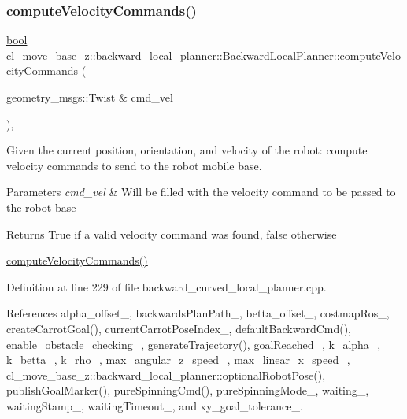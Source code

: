 \subsubsection{\texorpdfstring{compute\+Velocity\+Commands()}{computeVelocityCommands()}}
{\footnotesize\ttfamily \hyperlink{classbool}{bool} cl\+\_\+move\+\_\+base\+\_\+z\+::backward\+\_\+local\+\_\+planner\+::\+Backward\+Local\+Planner\+::compute\+Velocity\+Commands (\begin{DoxyParamCaption}\item[{geometry\+\_\+msgs\+::\+Twist \&}]{cmd\+\_\+vel }\end{DoxyParamCaption})\hspace{0.3cm}{\ttfamily [override]}, {\ttfamily [virtual]}}



Given the current position, orientation, and velocity of the robot\+: compute velocity commands to send to the robot mobile base. 


\begin{DoxyParams}{Parameters}
{\em cmd\+\_\+vel} & Will be filled with the velocity command to be passed to the robot base \\
\hline
\end{DoxyParams}
\begin{DoxyReturn}{Returns}
True if a valid velocity command was found, false otherwise
\end{DoxyReturn}
\hyperlink{classcl__move__base__z_1_1backward__local__planner_1_1BackwardLocalPlanner_a25437208766366ca22f967fe72e80988}{compute\+Velocity\+Commands()} 

Definition at line 229 of file backward\+\_\+curved\+\_\+local\+\_\+planner.\+cpp.



References alpha\+\_\+offset\+\_\+, backwards\+Plan\+Path\+\_\+, betta\+\_\+offset\+\_\+, costmap\+Ros\+\_\+, create\+Carrot\+Goal(), current\+Carrot\+Pose\+Index\+\_\+, default\+Backward\+Cmd(), enable\+\_\+obstacle\+\_\+checking\+\_\+, generate\+Trajectory(), goal\+Reached\+\_\+, k\+\_\+alpha\+\_\+, k\+\_\+betta\+\_\+, k\+\_\+rho\+\_\+, max\+\_\+angular\+\_\+z\+\_\+speed\+\_\+, max\+\_\+linear\+\_\+x\+\_\+speed\+\_\+, cl\+\_\+move\+\_\+base\+\_\+z\+::backward\+\_\+local\+\_\+planner\+::optional\+Robot\+Pose(), publish\+Goal\+Marker(), pure\+Spinning\+Cmd(), pure\+Spinning\+Mode\+\_\+, waiting\+\_\+, waiting\+Stamp\+\_\+, waiting\+Timeout\+\_\+, and xy\+\_\+goal\+\_\+tolerance\+\_\+.


